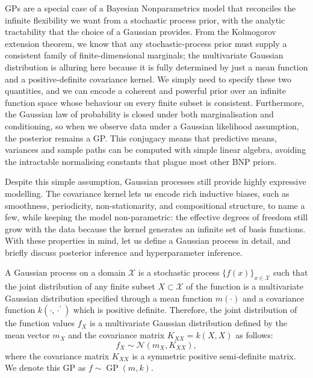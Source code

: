 GPs are a special case of a Bayesian Nonparametrics model that reconciles the infinite flexibility we want from a stochastic process prior, with the analytic tractability that the choice of a Gaussian provides. From the Kolmogorov extension theorem, we know that any stochastic-process prior must supply a consistent family of finite-dimensional marginals; the multivariate Gaussian distribution is alluring here because it is fully determined by just a mean function and a positive-definite covariance kernel. We simply need to specify these two quantities, and we can encode a coherent and powerful prior over an infinite function space whose behaviour on every finite subset is consistent. Furthermore, the Gaussian law of probability is closed under both marginalisation and conditioning, so when we observe data under a Gaussian likelihood assumption, the posterior remains a GP. This conjugacy means that predictive means, variances and sample paths can be computed with simple linear algebra, avoiding the intractable normalising constants that plague most other BNP priors.

Despite this simple assumption, Gaussian processes still provide highly expressive modelling. The covariance kernel lets us encode rich inductive biases, such as smoothness, periodicity, non-stationarity, and compositional structure, to name a few, while keeping the model non-parametric: the effective degrees of freedom still grow with the data because the kernel generates an infinite set of basis functions. With these properties in mind, let us define a Gaussian process in detail, and briefly discuss posterior inference and hyperparameter inference.
\label{ntn:gaussian_process}\label{ntn:covariance_matrix}
\begin{definition}
    \label{def:gaussian_process}
    A Gaussian process on a domain $\mathcal{X}$ is a stochastic process $\{f(x)\}_{x \in \mathcal{X}}$ such that the joint distribution of any finite subset $X \subset \mathcal{X}$ of the function is a multivariate Gaussian distribution specified through a mean function $m( \cdot)$ and a covariance function $k( \cdot, \cdot^{\prime})$ which is positive definite. Therefore, the joint distribution of the function values $f_X$ is a multivariate Gaussian distribution defined by the mean vector $m_X$ and the covariance matrix $K_{XX} = k(X, X)$ as follows:
    \[
        f_X \sim \mathcal{N}\left(m_X, K_{XX}\right),
    \]
    where the covariance matrix $K_{XX}$ is a symmetric positive semi-definite matrix. We denote this GP as $f \sim \operatorname{GP}(m, k)$.
\end{definition}

